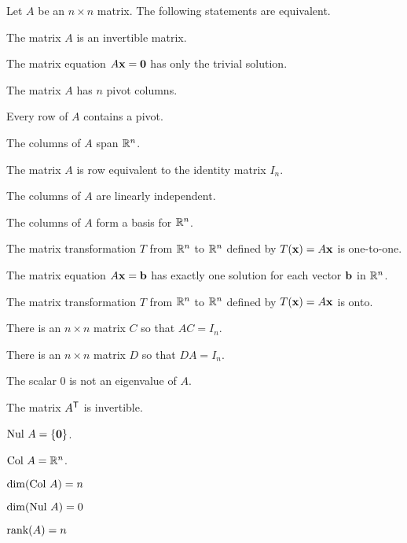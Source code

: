\begin{theorem} \label{thm:3_d_IMT} Let $A$ be an $n \times n$ matrix. The following statements are equivalent.
\ba
\item The matrix $A$ is an invertible matrix.
\item The matrix equation $A \mathbf{x} = \mathbf{0}$ has only the trivial solution.
\item The matrix $A$ has $n$ pivot columns.
\item Every row of $A$ contains a pivot. 
\item The columns of $A$ span $\mathbb{R}^n$.
\item The matrix $A$ is row equivalent to the identity matrix $I_n$.
\item The columns of $A$ are linearly independent.
\item The columns of $A$ form a basis for $\mathbb{R}^n$.
\item The matrix transformation $T$ from $\mathbb{R}^n$ to $\mathbb{R}^n$ defined by $T(\mathbf{x}) = A\mathbf{x}$ is one-to-one.
\item The matrix equation $A \mathbf{x} = \mathbf{b}$ has exactly one solution for each vector $\mathbf{b}$ in $\mathbb{R}^n$.
\item The matrix transformation $T$ from $\mathbb{R}^n$ to $\mathbb{R}^n$ defined by $T(\mathbf{x}) = A\mathbf{x}$ is onto.
\item There is an $n \times n$ matrix $C$ so that $AC = I_n$.
\item There is an $n \times n$ matrix $D$ so that $DA = I_n$.
\item The scalar 0 is not an eigenvalue of $A$.
\item The matrix $A^{\mathsf{T}}$ is invertible.
\item $\text{Nul } A = \{\mathbf{0}\}$.
\item $\text{Col } A = \mathbb{R}^n$.
\item $\dim(\text{Col } A) = n$
\item $\dim(\text{Nul } A) = 0$
\item $\text{rank}(A) = n$
\ea
\end{theorem}


\label{sec:base_dim_exam}

\ExampleIntro

